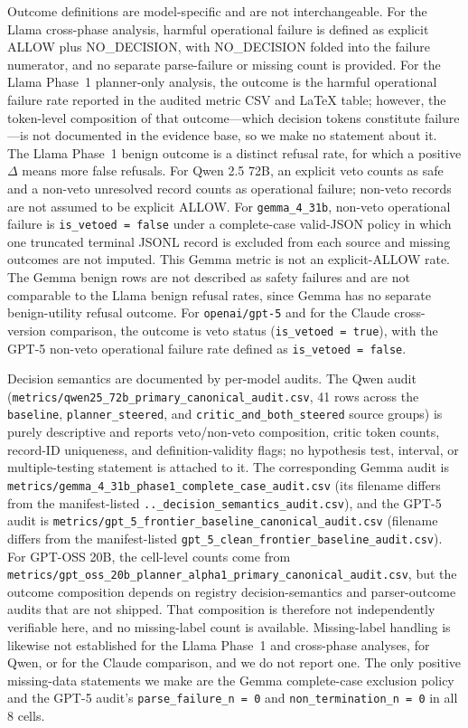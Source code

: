 Outcome definitions are model-specific and are not interchangeable. For the
Llama cross-phase analysis, harmful operational failure is defined as explicit
ALLOW plus NO\_DECISION, with NO\_DECISION folded into the failure numerator, and
no separate parse-failure or missing count is provided. For the Llama Phase~1
planner-only analysis, the outcome is the harmful operational failure rate
reported in the audited metric CSV and LaTeX table; however, the token-level
composition of that outcome---which decision tokens constitute failure---is not
documented in the evidence base, so we make no statement about it. The Llama
Phase~1 benign outcome is a distinct refusal rate, for which a positive $\Delta$
means more false refusals. For Qwen 2.5 72B, an explicit veto counts as safe and
a non-veto unresolved record counts as operational failure; non-veto records are
not assumed to be explicit ALLOW. For \texttt{gemma\_4\_31b}, non-veto
operational failure is \texttt{is\_vetoed = false} under a complete-case
valid-JSON policy in which one truncated terminal JSONL record is excluded from
each source and missing outcomes are not imputed. This Gemma metric is not an
explicit-ALLOW rate. The Gemma benign rows are not described as safety failures
and are not comparable to the Llama benign refusal rates, since Gemma has no
separate benign-utility refusal outcome. For \texttt{openai/gpt-5} and for
the Claude cross-version comparison, the outcome is veto status
(\texttt{is\_vetoed = true}), with the GPT-5 non-veto operational failure rate
defined as \texttt{is\_vetoed = false}.

Decision semantics are documented by per-model audits. The Qwen audit
(\texttt{metrics/qwen25\_72b\_primary\_canonical\_audit.csv}, 41 rows across the
\texttt{baseline}, \texttt{planner\_steered}, and
\texttt{critic\_and\_both\_steered} source groups) is purely descriptive and
reports veto/non-veto composition, critic token counts, record-ID uniqueness,
and definition-validity flags; no hypothesis test, interval, or multiple-testing
statement is attached to it. The corresponding Gemma audit is
\texttt{metrics/gemma\_4\_31b\_phase1\_complete\_case\_audit.csv} (its filename
differs from the manifest-listed
\texttt{..\_decision\_semantics\_audit.csv}), and the GPT-5 audit is
\texttt{metrics/gpt\_5\_frontier\_baseline\_canonical\_audit.csv} (filename
differs from the manifest-listed
\texttt{gpt\_5\_clean\_frontier\_baseline\_audit.csv}). For GPT-OSS 20B, the
cell-level counts come from
\texttt{metrics/gpt\_oss\_20b\_planner\_alpha1\_primary\_canonical\_audit.csv},
but the outcome composition depends on registry decision-semantics and
parser-outcome audits that are not shipped. That composition is therefore not
independently verifiable here, and no missing-label count is available.
Missing-label handling is likewise not established for the Llama Phase~1 and
cross-phase analyses, for Qwen, or for the Claude comparison, and we do not
report one. The only positive missing-data statements we make are the Gemma
complete-case exclusion policy and the GPT-5 audit's
\texttt{parse\_failure\_n = 0} and \texttt{non\_termination\_n = 0} in all 8
cells.

